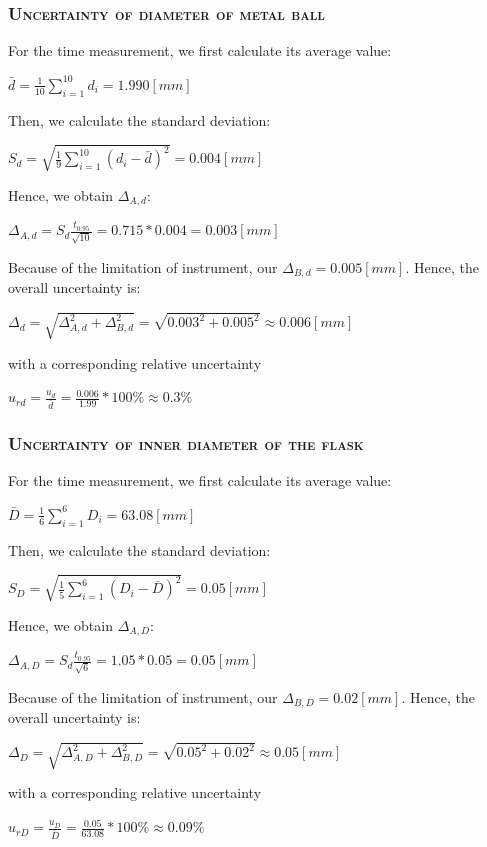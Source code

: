 \documentclass[a4paper,12pt]{article}
\begin{document}
\begin{appendices}
      \subsubsection{\textsc{Uncertainty of diameter of metal ball}}
      For the time measurement, we first calculate its average value:
      \begin{center}
      $\displaystyle\bar{d} = \frac{1}{10}\sum_{i=1}^{10}d_i = 1.990 [mm]$
      \end{center}
      Then, we calculate the standard deviation:
      \begin{center}
      $\displaystyle S_d = \sqrt{\frac{1}{9}\sum_{i=1}^{10}(d_i - \bar{d})^2} = 0.004 [mm]$
      \end{center}
      Hence, we obtain $\Delta_{A,d}$:
      \begin{center}
      $\displaystyle\Delta_{A,d} = S_d \frac{t_{0.95}}{\sqrt{10}} = 0.715*0.004 = 0.003 [mm]$
      \end{center}
      Because of the limitation of instrument, our $\Delta_{B,d} = 0.005 [mm]$. Hence, the overall uncertainty is:
      \begin{center}
      $\Delta_d = \sqrt{\Delta_{A,d}^2 + \Delta_{B,d}^2} = \sqrt{0.003^2 + 0.005^2} \approx 0.006 [mm]$
      \end{center}
      with a corresponding relative uncertainty
      \begin{center}
      $\displaystyle u_{rd} = \frac{u_d}{\bar{d}} = \frac{0.006}{1.99}*100\% \approx 0.3\%$
      \end{center}      
      
      \subsubsection{\textsc{Uncertainty of inner diameter of the flask}}
      For the time measurement, we first calculate its average value:
      \begin{center}
      $\displaystyle\bar{D} = \frac{1}{6}\sum_{i=1}^{6}D_i = 63.08 [mm]$
      \end{center}
      Then, we calculate the standard deviation:
      \begin{center}
      $\displaystyle S_D = \sqrt{\frac{1}{5}\sum_{i=1}^{6}(D_i - \bar{D})^2} = 0.05 [mm]$
      \end{center}
      Hence, we obtain $\Delta_{A,D}$:
      \begin{center}
      $\displaystyle\Delta_{A,D} = S_d \frac{t_{0.95}}{\sqrt{6}} = 1.05*0.05 = 0.05 [mm]$
      \end{center}
      Because of the limitation of instrument, our $\Delta_{B,D} = 0.02 [mm]$. Hence, the overall uncertainty is:
      \begin{center}
      $\displaystyle \Delta_D = \sqrt{\Delta_{A,D}^2 + \Delta_{B,D}^2} = \sqrt{0.05^2 + 0.02^2} \approx 0.05 [mm]$
      \end{center}
      with a corresponding relative uncertainty
      \begin{center}
      $\displaystyle u_{rD} = \frac{u_D}{\bar{D}} = \frac{0.05}{63.08}*100\% \approx 0.09\%$
      \end{center}      
      

\end{appendices}
\end{document}
